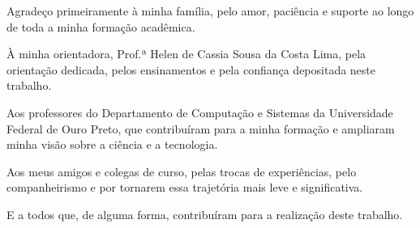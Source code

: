 \begin{agradecimentos}

Agradeço primeiramente à minha família, pelo amor, paciência e suporte ao longo de toda a minha formação acadêmica.

À minha orientadora, Prof.ª Helen de Cassia Sousa da Costa Lima, pela orientação dedicada, pelos ensinamentos e pela confiança depositada neste trabalho.

Aos professores do Departamento de Computação e Sistemas da Universidade Federal de Ouro Preto, que contribuíram para a minha formação e ampliaram minha visão sobre a ciência e a tecnologia.

Aos meus amigos e colegas de curso, pelas trocas de experiências, pelo companheirismo e por tornarem essa trajetória mais leve e significativa.

E a todos que, de alguma forma, contribuíram para a realização deste trabalho.

\end{agradecimentos}